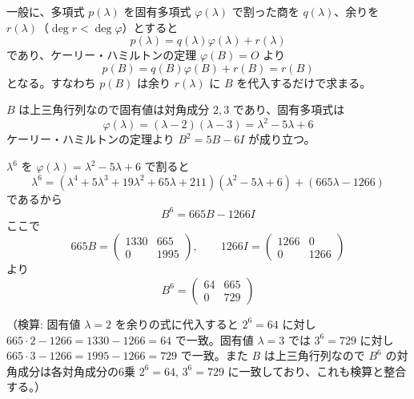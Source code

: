 
一般に、多項式 $p(\lambda)$ を固有多項式 $\varphi(\lambda)$ で割った商を $q(\lambda)$、余りを $r(\lambda)$（$\deg r < \deg \varphi$）とすると
\[
p(\lambda) = q(\lambda)\varphi(\lambda) + r(\lambda)
\]
であり、ケーリー・ハミルトンの定理 $\varphi(B) = O$ より
\[
p(B) = q(B)\varphi(B) + r(B) = r(B)
\]
となる。すなわち $p(B)$ は余り $r(\lambda)$ に $B$ を代入するだけで求まる。

$B$ は上三角行列なので固有値は対角成分 $2, 3$ であり、固有多項式は
\[
\varphi(\lambda) = (\lambda - 2)(\lambda - 3) = \lambda^{2} - 5\lambda + 6
\]
ケーリー・ハミルトンの定理より $B^{2} = 5B - 6I$ が成り立つ。

$\lambda^{6}$ を $\varphi(\lambda) = \lambda^{2} - 5\lambda + 6$ で割ると
\[
\lambda^{6} = (\lambda^{4} + 5\lambda^{3} + 19\lambda^{2} + 65\lambda + 211)(\lambda^{2} - 5\lambda + 6) + (665\lambda - 1266)
\]
であるから
\[
B^{6} = 665B - 1266I
\]
ここで
\[
665B = \begin{pmatrix} 1330 & 665 \\ 0 & 1995 \end{pmatrix}, \qquad 1266I = \begin{pmatrix} 1266 & 0 \\ 0 & 1266 \end{pmatrix}
\]
より
\[
\boxed{\; B^{6} = \begin{pmatrix} 64 & 665 \\ 0 & 729 \end{pmatrix} \;}
\]

（検算: 固有値 $\lambda=2$ を余りの式に代入すると $2^{6} = 64$ に対し $665\cdot2 - 1266 = 1330-1266=64$ で一致。固有値 $\lambda=3$ では $3^{6}=729$ に対し $665\cdot3-1266=1995-1266=729$ で一致。また $B$ は上三角行列なので $B^{6}$ の対角成分は各対角成分の6乗 $2^{6}=64$, $3^{6}=729$ に一致しており、これも検算と整合する。）
